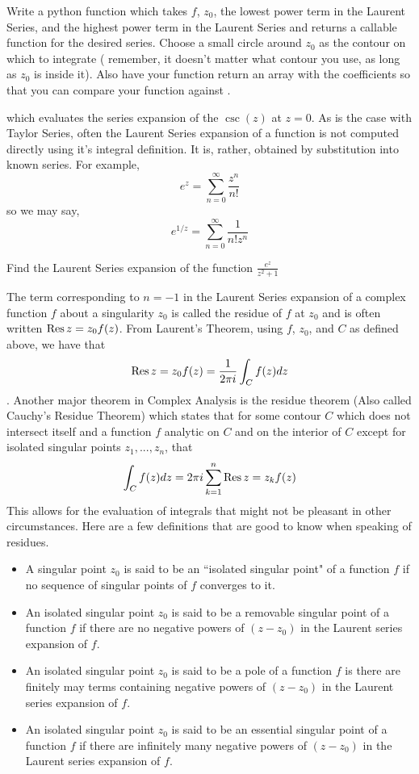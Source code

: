 \begin{problem}
Write a python function which takes $f$, $z_0$, the lowest power term in the Laurent Series, and the highest power term in the Laurent Series and returns a callable function for the desired series. Choose a small circle around $z_0$ as the contour on which to integrate ( remember, it doesn't matter what contour you use, as long as $z_0$ is inside it). Also have your function return an array with the coefficients so that you can compare your function against .
\end{problem}

which evaluates the series expansion of the $\csc(z)$ at $z=0$. 
As is the case with Taylor Series, often the Laurent Series expansion of a function is not computed directly using it's integral definition.
It is, rather, obtained by substitution into known series.
For example, 
$$e^z = \sum_{n=0}^{\infty} \frac{z^n}{n!}$$ so we may say,
$$e^{1/z} = \sum_{n=0}^{\infty} \frac{1}{n! z^n}$$

\begin{problem}
Find the Laurent Series expansion of the function $\frac{e^{z}}{z^2 +1}$
\end{problem}

The term corresponding to $n=-1$ in the Laurent Series expansion of a complex function $f$ about a singularity $z_0$ is called the residue of $f$ at $z_0$ and is often written $\operatorname{Res}{z=z_0} f(z)$.
From Laurent's Theorem, using $f$, $z_0$, and $C$ as defined above, we have that $$\operatorname{Res}{z=z_0} f(z) = \frac{1}{2 \pi i} \int_C f(z) dz$$.
Another major theorem in Complex Analysis is the residue theorem (Also called Cauchy's Residue Theorem) which states that for some contour $C$ which does not intersect itself and a function $f$ analytic on $C$ and on the interior of $C$ except for isolated singular points $z_1,...,z_n$, that 
$$\int_C f(z) dz = 2 \pi i \sum_{k=1}^{n} \operatorname{Res}{z=z_k} f(z)$$
This allows for the evaluation of integrals that might not be pleasant in other circumstances.
Here are a few definitions that are good to know when speaking of residues.
\begin{itemize}
\item A singular point $z_0$ is said to be an ``isolated singular point" of a function $f$ if no sequence of singular points of $f$ converges to it.
\item An isolated singular point $z_0$ is said to be a removable singular point of a function $f$ if there are no negative powers of $(z-z_0)$ in the Laurent series expansion of $f$.
\item An isolated singular point $z_0$ is said to be a pole of a function $f$ is there are finitely may terms containing negative powers of $(z-z_0)$ in the Laurent series expansion of $f$. 
\item An isolated singular point $z_0$ is said to be an essential singular point of a function $f$ if there are infinitely many negative powers of $(z-z_0)$ in the Laurent series expansion of $f$.
\end{itemize}

